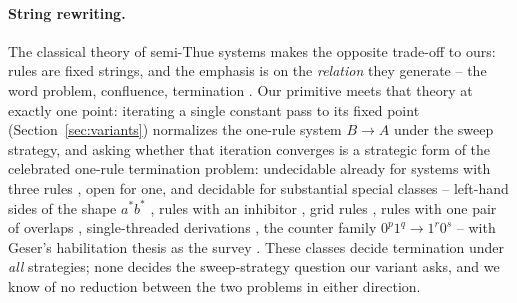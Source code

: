\documentclass[runningheads,envcountsect]{llncs}
\begin{document}
\paragraph{String rewriting.} The classical theory of semi-Thue systems makes the opposite trade-off to ours: rules are fixed strings, and the emphasis is on the \emph{relation} they generate -- the word problem, confluence, termination \cite{thue14,book93}. Our primitive meets that theory at exactly one point: iterating a single constant pass to its fixed point (Section~\ref{sec:variants}) normalizes the one-rule system $B \to A$ under the sweep strategy, and asking whether that iteration converges is a strategic form of the celebrated one-rule termination problem: undecidable already for systems with three rules \cite{matiyasevich05}, open for one, and decidable for substantial special classes -- left-hand sides of the shape $a^*b^*$ \cite{senizergues96}, rules with an inhibitor \cite{mcnaughton01}, grid rules \cite{geser02}, rules with one pair of overlaps \cite{geser03}, single-threaded derivations \cite{moczydlowski05}, the counter family $0^p1^q \to 1^r0^s$ \cite{zantema00} -- with Geser's habilitation thesis as the survey \cite{geser01}. These classes decide termination under \emph{all} strategies; none decides the sweep-strategy question our variant asks, and we know of no reduction between the two problems in either direction.
\end{document}
